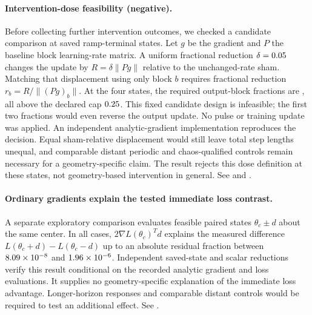 \documentclass[11pt,letterpaper]{article}
\begin{document}
\paragraph{Intervention-dose feasibility (negative).} Before collecting further intervention outcomes,
we checked a candidate comparison at \nDoseForks{} saved ramp-terminal states. Let $g$ be the gradient and
$P$ the baseline block learning-rate matrix. A uniform fractional reduction
$\delta=0.05$ changes the update by $R=\delta\|Pg\|$ relative to the unchanged-rate sham.
Matching that displacement using only block $b$ requires fractional reduction
$r_b=R/\|(Pg)_b\|$. At the four states, the required output-block fractions are
\tDoseOutputFractions{}, all above the declared cap $0.25$. This fixed candidate design is
infeasible; the first two fractions would even reverse the output update. No pulse or training update was applied. An independent analytic-gradient implementation
reproduces the decision. Equal sham-relative displacement would still leave total step lengths unequal,
and comparable distant periodic and chaos-qualified controls remain necessary for a geometry-specific claim.
The result rejects this dose definition at these states, not geometry-based intervention in general. See
 and .

\paragraph{Ordinary gradients explain the tested immediate loss contrast.}
A separate exploratory comparison evaluates feasible paired states
$\theta_c\pm d$ about the same center. In all \nCommonCenterCases{} cases,
$2\nabla L(\theta_c)^T d$ explains the measured difference
$L(\theta_c+d)-L(\theta_c-d)$ up to an absolute residual fraction between
$8.09\times10^{-8}$ and $1.96\times10^{-6}$.
Independent saved-state and scalar reductions verify this result conditional
on the recorded analytic gradient and loss evaluations. It supplies no
geometry-specific explanation of the immediate loss advantage. Longer-horizon
responses and comparable distant controls would be required to test an
additional effect. See .
\end{document}

